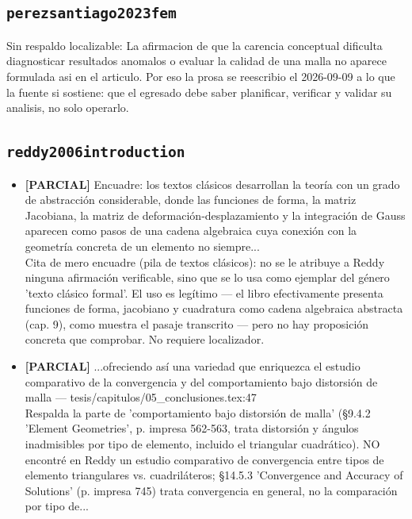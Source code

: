 \documentclass[11pt,a4paper]{article}
\newcommand{\campo}[1]{\textcolor{gris}{\footnotesize #1}}
\begin{document}
\subsection{\texttt{perezsantiago2023fem}}
{\small\campo{Sin respaldo localizable:} La afirmacion de que la carencia conceptual \textquotedbl{}dificulta diagnosticar resultados anomalos o evaluar la calidad de una malla\textquotedbl{} no aparece formulada asi en el articulo. Por eso la prosa se reescribio el 2026-09-09 a lo que la fuente si sostiene: que el egresado debe saber planificar, verificar y validar su analisis, no solo operarlo.\par}
\subsection{\texttt{reddy2006introduction}}
\begin{itemize}\small
\item \textbf{[PARCIAL]} Encuadre: \textquotedbl{}los textos clásicos desarrollan la teoría con un grado de abstracción considerable, donde las funciones de forma, la matriz Jacobiana, la matriz de deformación-desplazamiento y la integración de Gauss aparecen como pasos de una cadena algebraica cuya conexión con la geometría concreta de un elemento no siempre...
\\ \campo{Cita de mero encuadre (pila de textos clásicos): no se le atribuye a Reddy ninguna afirmación verificable, sino que se lo usa como ejemplar del género 'texto clásico formal'. El uso es legítimo --- el libro efectivamente presenta funciones de forma, jacobiano y cuadratura como cadena algebraica abstracta (cap. 9), como muestra el pasaje transcrito --- pero no hay proposición concreta que comprobar. No requiere localizador.}
\item \textbf{[PARCIAL]} \textquotedbl{}...ofreciendo así una variedad que enriquezca el estudio comparativo de la convergencia y del comportamiento bajo distorsión de malla\textquotedbl{} --- tesis/capitulos/05\_conclusiones.tex:47
\\ \campo{Respalda la parte de 'comportamiento bajo distorsión de malla' (§9.4.2 'Element Geometries', p. impresa 562-563, trata distorsión y ángulos inadmisibles por tipo de elemento, incluido el triangular cuadrático). NO encontré en Reddy un estudio comparativo de convergencia entre tipos de elemento triangulares vs. cuadriláteros; §14.5.3 'Convergence and Accuracy of Solutions' (p. impresa 745) trata convergencia en general, no la comparación por tipo de...}
\end{itemize}
\end{document}
